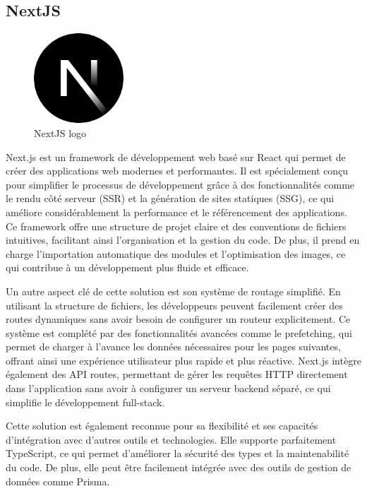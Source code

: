 \documentclass[a4paper,12pt]{report}
\numberwithin{equation}{section}
\begin{document}
\subsection{NextJS}
\begin{figure}[H]
    \centering
    \includegraphics[width=0.3\textwidth]{tech/nextjs.png}
    \caption{NextJS logo}
    \label{fig:NextJS logo}
\end{figure}
\par
Next.js est un framework de développement web basé sur React qui permet de créer des applications web modernes et performantes. Il est spécialement conçu pour simplifier le processus de développement grâce à des fonctionnalités comme le rendu côté serveur (SSR) et la génération de sites statiques (SSG), ce qui améliore considérablement la performance et le référencement des applications. Ce framework offre une structure de projet claire et des conventions de fichiers intuitives, facilitant ainsi l'organisation et la gestion du code. De plus, il prend en charge l'importation automatique des modules et l'optimisation des images, ce qui contribue à un développement plus fluide et efficace.
\\ \par
Un autre aspect clé de cette solution est son système de routage simplifié. En utilisant la structure de fichiers, les développeurs peuvent facilement créer des routes dynamiques sans avoir besoin de configurer un routeur explicitement. Ce système est complété par des fonctionnalités avancées comme le prefetching, qui permet de charger à l'avance les données nécessaires pour les pages suivantes, offrant ainsi une expérience utilisateur plus rapide et plus réactive. Next.js intègre également des API routes, permettant de gérer les requêtes HTTP directement dans l'application sans avoir à configurer un serveur backend séparé, ce qui simplifie le développement full-stack.
\\ \par
Cette solution est également reconnue pour sa flexibilité et ses capacités d'intégration avec d'autres outils et technologies. Elle supporte parfaitement TypeScript, ce qui permet d'améliorer la sécurité des types et la maintenabilité du code. De plus, elle peut être facilement intégrée avec des outils de gestion de données comme Prisma.
\newpage
\end{document}
